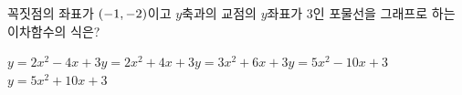 꼭짓점의 좌표가 $(-1{,}\mkern3mu\mathopen{}-2)$이고 $y$축과의 교점의 $y$좌표가 $3$인 포물선을 그래프로 하는 이차함수의 식은?
\begin{choicesii}{$y=2x^2-4x+3$}{$y=2x^2+4x+3$}{$y=3x^2+6x+3$}{$y=5x^2-10x+3$}{$y=5x^2+10x+3$}\end{choicesii}
